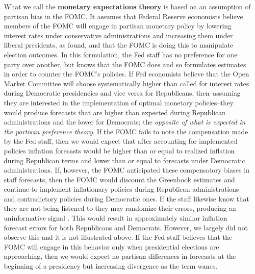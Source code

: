 \documentclass[a4paper]{article}\usepackage{graphicx, color}
\begin{document}
What we call the {\bf{monetary expectations theory}} is based on an assumption of partisan bias in the FOMC. It assumes that Federal Reserve economists believe members of the FOMC will engage in partisan monetary policy by lowering interest rates under conservative administrations and increasing them under liberal presidents, as \cite{Clark2012} found, and that the FOMC is doing this to manipulate election outcomes. In this formulation, the Fed staff has no preference for one party over another, but knows that the FOMC does and so formulates estimates in order to counter the FOMC's policies. If Fed economists believe that the Open Market Committee will choose systematically higher than called for interest rates during Democratic presidencies and vice versa for Republicans, then--assuming they are interested in the implementation of optimal monetary policies--they would produce forecasts that are higher than expected during Republican administrations and the lower for Democrats; the {\emph{opposite of what is expected in the partisan preference theory}}. If the FOMC fails to note the compensation made by the Fed staff, then we would expect that after accounting for implemented policies inflation forecasts would be higher than or equal to realized inflation during Republican terms and lower than or equal to forecasts under Democratic administrations. If, however, the FOMC anticipated these compensatory biases in staff forecasts, then the FOMC would discount the Greenbook estimates and continue to implement inflationary policies during Republican administrations and contradictory policies during Democratic ones. If the staff likewise know that they are not being listened to they may randomize their errors, producing an uninformative signal \citep{Crawford1982}. This would result in approximately similar inflation forecast errors for both Republicans and Democrats. However, we largely did not observe this and it is not illustrated above. If the Fed staff believes that the FOMC will engage in this behavior only when presidential elections are approaching, then we would expect no partisan differences in forecasts at the beginning of a presidency but increasing divergence as the term wanes.
 
\end{document}
